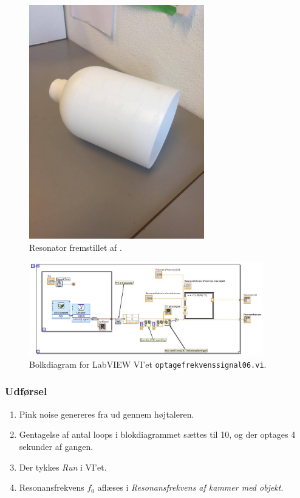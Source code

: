 	\begin{figure}
	\centering
	\includegraphics[width=3in]{resonator.jpg}
	\caption{Resonator fremstillet af .}
	\label{fig:resonator}	
	\end{figure}

	\begin{figure}
	\centering
	\includegraphics[width=4in]{optagefrekvenssignal06.jpeg}
	\caption{Bolkdiagram for LabVIEW VI'et \texttt{optagefrekvenssignal06.vi}.}
	\label{fig:optagefrekvenssignal06}	
	\end{figure}
	
	\subsubsection{Udførsel}
			
			\begin{enumerate}
			\item Pink noise genereres fra \onlineg  ud gennem højtaleren. 
			\item Gentagelse af antal loops i blokdiagrammet sættes til 10, og der optages 4 sekunder af gangen. 
			\item Der tykkes \textit{Run} i VI'et. 
			\item Resonansfrekvens $f_{0}$ aflæses i \textit{Resonansfrekvens af kammer med objekt}.
			\end{enumerate}
			
			
			
	
		
	


		
	
	
	

	